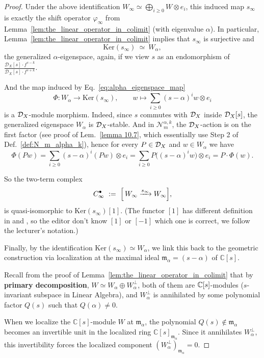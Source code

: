 \begin{proof}
    Under the above identification $W_\infty\simeq \bigoplus_{i\ge 0} W\otimes e_i$,
    this induced map $s_\infty$ is exactly the shift operator $\varphi_\infty$ from Lemma~\ref{lem:the_linear_operator_in_colimit}
    (with eigenvalue $\alpha$). In particular, Lemma~\ref{lem:the_linear_operator_in_colimit} implies that $s_\infty$ is surjective and
    \[
        \mathrm{Ker}(s_\infty)\ \simeq\ W_\alpha,
    \]
    the generalized $\alpha$-eigenspace, again, if we view $s$ as an endomorphism of $\frac{\mathcal{D}_X[s] \cdot f^{s-k}}{\mathcal{D}_X[s] \cdot f^{s+k}}$.

    And the map induced by Eq.~\ref{eq:alpha_eigenspace_map}
    \[
        \Phi:W_\alpha \longrightarrow \mathrm{Ker}(s_\infty),\qquad
        w\longmapsto \sum_{i\ge 0}(s-\alpha)^i w\otimes e_i
    \]
    is a $\mathcal{D}_X$-module morphism. Indeed, since $s$ commutes with $\mathcal{D}_X$ inside $\mathcal{D}_X[s]$,
    the generalized eigenspace $W_\alpha$ is $\mathcal{D}_X$-stable. And in $\mathcal{N}_m^{\alpha,k}$, the $\mathcal{D}_X$-action is on the first factor (see proof of Lem.~\ref{lemma 10.7}, which essentially use Step 2 of Def.~\ref{def:N_m_alpha_k}),
    hence for every $P\in \mathcal{D}_X$ and $w\in W_\alpha$ we have
    \[
        \Phi(Pw)=\sum_{i\ge 0}(s-\alpha)^i(Pw)\otimes e_i
        =\sum_{i\ge 0}P\bigl((s-\alpha)^i w\bigr)\otimes e_i
        =P\cdot \Phi(w).
    \]

    So the two-term complex
    \[
        C_\infty^\bullet\ :=\ \Bigl[\,W_\infty\xrightarrow{s_\infty}W_\infty\Bigr],
    \]
    is quasi-isomorphic to $\mathrm{Ker}(s_\infty)[1]$.
    (The functor $[1]$ has different definition in \cite[\href{https://stacks.math.columbia.edu/tag/05RR}{Tag 05RR}]{stacks-project} and \cite[Translation~1.2.8]{Weibel1994HA}, so the editor don't know $[1]$ or $[-1]$ which one is correct, we follow the lecturer's notation.)

    Finally, by the identification $\mathrm{Ker}(s_\infty)\simeq W_\alpha$, we link this back to the geometric construction via localization at the maximal ideal $\mathfrak{m}_\alpha = (s-\alpha)$ of $\mathbb{C}[s]$.

    Recall from the proof of Lemma~\ref{lem:the_linear_operator_in_colimit} that by \textbf{primary decomposition}, $W \simeq W_\alpha \oplus W_\alpha^\perp$,
    both of them are $\mathbb{C}[s]$-modules ($s$-invariant subspace in Linear Algebra), and $W_\alpha^\perp$ is annihilated by some polynomial factor $Q(s)$ such that $Q(\alpha) \neq 0$.

    When we localize the $\mathbb{C}[s]$-module $W$ at $\mathfrak{m}_\alpha$, the polynomial $Q(s) \notin \mathfrak{m}_\alpha$ becomes an invertible unit in the localized ring $\mathbb{C}[s]_{\mathfrak{m}_\alpha}$.
    Since it annihilates $W_\alpha^\perp$, this invertibility forces the localized component $(W_\alpha^\perp)_{\mathfrak{m}_\alpha} = 0$.


\end{proof}
